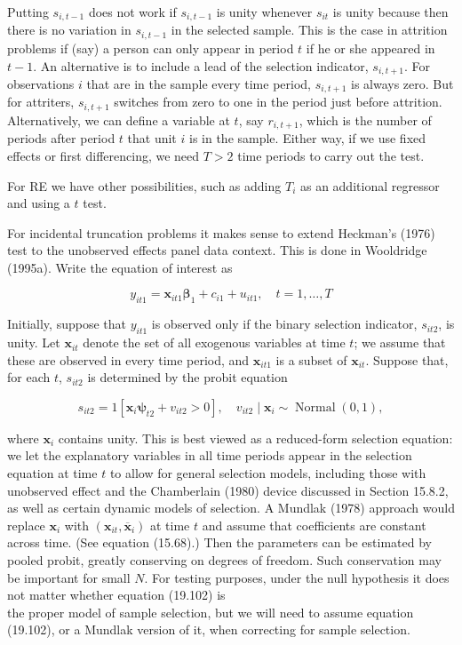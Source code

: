 \documentclass[10pt]{article}
\begin{document}
Putting $s_{i, t-1}$ does not work if $s_{i, t-1}$ is unity whenever $s_{i t}$ is unity because then there is no variation in $s_{i, t-1}$ in the selected sample. This is the case in attrition problems if (say) a person can only appear in period $t$ if he or she appeared in $t-1$. An alternative is to include a lead of the selection indicator, $s_{i, t+1}$. For observations $i$ that are in the sample every time period, $s_{i, t+1}$ is always zero. But for attriters, $s_{i, t+1}$ switches from zero to one in the period just before attrition. Alternatively, we can define a variable at $t$, say $r_{i, t+1}$, which is the number of periods after period $t$ that unit $i$ is in the sample. Either way, if we use fixed effects or first differencing, we need $T>2$ time periods to carry out the test.

For RE we have other possibilities, such as adding $T_{i}$ as an additional regressor and using a $t$ test.

For incidental truncation problems it makes sense to extend Heckman's (1976) test to the unobserved effects panel data context. This is done in Wooldridge (1995a). Write the equation of interest as


\begin{equation*}
y_{i t 1}=\mathbf{x}_{i t 1} \boldsymbol{\beta}_{1}+c_{i 1}+u_{i t 1}, \quad t=1, \ldots, T \tag{19.101}
\end{equation*}


Initially, suppose that $y_{i t 1}$ is observed only if the binary selection indicator, $s_{i t 2}$, is unity. Let $\mathbf{x}_{i t}$ denote the set of all exogenous variables at time $t$; we assume that these are observed in every time period, and $\mathbf{x}_{i t 1}$ is a subset of $\mathbf{x}_{i t}$. Suppose that, for each $t$, $s_{i t 2}$ is determined by the probit equation


\begin{equation*}
s_{i t 2}=1\left[\mathbf{x}_{i} \boldsymbol{\psi}_{t 2}+v_{i t 2}>0\right], \quad v_{i t 2} \mid \mathbf{x}_{i} \sim \operatorname{Normal}(0,1), \tag{19.102}
\end{equation*}


where $\mathbf{x}_{i}$ contains unity. This is best viewed as a reduced-form selection equation: we let the explanatory variables in all time periods appear in the selection equation at time $t$ to allow for general selection models, including those with unobserved effect and the Chamberlain (1980) device discussed in Section 15.8.2, as well as certain dynamic models of selection. A Mundlak (1978) approach would replace $\mathbf{x}_{i}$ with $\left(\mathbf{x}_{i t}, \overline{\mathbf{x}}_{i}\right)$ at time $t$ and assume that coefficients are constant across time. (See equation (15.68).) Then the parameters can be estimated by pooled probit, greatly conserving on degrees of freedom. Such conservation may be important for small $N$. For testing purposes, under the null hypothesis it does not matter whether equation (19.102) is\\
the proper model of sample selection, but we will need to assume equation (19.102), or a Mundlak version of it, when correcting for sample selection.
\end{document}
